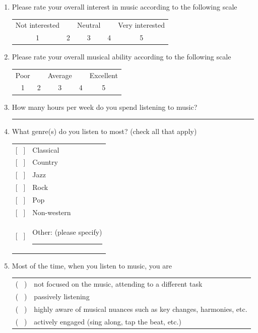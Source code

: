 \documentclass[a4paper,11pt]{article}
\newcommand{\myunderline}{\rule{2in}{.5pt}}
\begin{document}
{\begin{appendices}
\begin{enumerate}[resume]
	\item Please rate your overall interest in music according to the following scale

	\begin{tabular}{c c c c c}
		Not interested & & Neutral & & Very interested \\
		1 & 2 & 3 & 4 & 5 \\
	\end{tabular}

	\item Please rate your overall musical ability according to the following scale

	\begin{tabular}{c c c c c}
		Poor & & Average & & Excellent \\
		1 & 2 & 3 & 4 & 5 \\
	\end{tabular}

	\item How many hours per week do you spend listening to music?

	\myunderline

	\item What genre(s) do you listen to most? (check all that apply)

	\begin{tabular}{l l}
		{[{ \ }]} & Classical \\
		{[{ \ }]} & Country \\
		{[{ \ }]} & Jazz \\
		{[{ \ }]} & Rock \\
		{[{ \ }]} & Pop \\
		{[{ \ }]} & Non-western \\
		{[{ \ }]} & Other: (please specify) \myunderline \\
	\end{tabular}

	\item Most of the time, when you listen to music, you are

	\begin{tabular}{l l}
		( \ ) & not focused on the music, attending to a different task \\
		( \ ) & passively listening \\
		( \ ) & highly aware of musical nuances such as key changes, harmonies, etc. \\
		( \ ) & actively engaged (sing along, tap the beat, etc.) \\
	\end{tabular}


\end{enumerate}
\end{appendices}}
\end{document}
